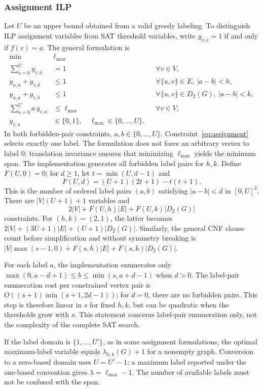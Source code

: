 \subsubsection{Assignment ILP}
Let $U$ be an upper bound obtained from a valid greedy labeling. To distinguish
ILP assignment variables from SAT threshold variables, write $y_{v,a}=1$
if and only if $f(v)=a$. The general formulation is
\begin{align}
 \min\quad &\ell_{\max}\\
 \sum_{a=0}^{U}y_{v,a}&=1 &&\forall v\in V,\label{eq:assignment}\\
 y_{u,a}+y_{v,b}&\leq1
 &&\forall\{u,v\}\in E,\ |a-b|<h,\\
 y_{u,a}+y_{v,b}&\leq1
 &&\forall\{u,v\}\in D_2(G),\ |a-b|<k,\\
 \sum_{a=0}^{U}a\,y_{v,a}&\leq\ell_{\max} &&\forall v\in V,\\
 y_{v,a}&\in\{0,1\},\quad \ell_{\max}\in\{0,\ldots,U\}.
\end{align}
In both forbidden-pair constraints, $a,b\in\{0,\ldots,U\}$.
Constraint~\eqref{eq:assignment} selects exactly one label. The formulation
does not force an arbitrary vertex to label 0; translation invariance
ensures that minimizing $\ell_{\max}$ yields the minimum span.
The implementation generates all forbidden label pairs for $h,k$.
Define $F(U,0)=0$; for $d\geq1$, let $t=\min(U,d-1)$ and
\[
F(U,d)=(U+1)(2t+1)-t(t+1).
\]
This is the number of ordered label pairs $(a,b)$ satisfying $|a-b|<d$
in $[0,U]^2$. There are $|V|(U+1)+1$ variables and
\[
2|V|+F(U,h)|E|+F(U,k)|D_2(G)|
\]
constraints. For $(h,k)=(2,1)$, the latter becomes
$2|V|+(3U+1)|E|+(U+1)|D_2(G)|$.
Similarly, the general CNF clause count before simplification and without
symmetry breaking is
$|V|\max(s-1,0)+F(s,h)|E|+F(s,k)|D_2(G)|$.

For each label $a$, the implementation enumerates only
$\max(0,a-d+1)\leq b\leq\min(s,a+d-1)$ when $d>0$.
The label-pair enumeration cost per constrained vertex pair is
$O((s+1)\min(s+1,2d-1))$; for $d=0$, there are no forbidden pairs.
This step is therefore linear in $s$ for fixed $h,k$, but can be quadratic
when the thresholds grow with $s$. This statement concerns label-pair
enumeration only, not the complexity of the complete SAT search.

\begin{remark}
If the label domain is $\{1,\ldots,U'\}$, as in some assignment formulations,
the optimal maximum-label variable equals $\lambda_{h,k}(G)+1$ for a nonempty
graph. Conversion to a zero-based domain uses $U=U'-1$; a maximum label
reported under the one-based convention gives $\lambda=\ell_{\max}-1$.
The number of available labels must not be confused with the span.
\end{remark}

